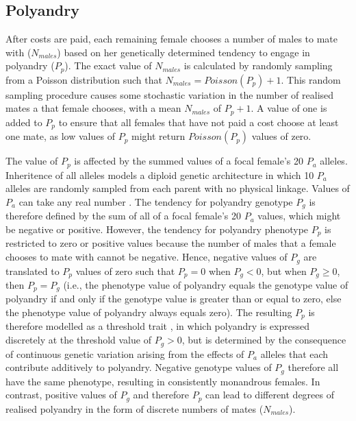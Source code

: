 \documentclass[10pt,letterpaper]{article}
\begin{document}
\subsection*{Polyandry}

After costs are paid, each remaining female chooses a number of males to mate with ($N_{males}$) based on her genetically determined tendency to engage in polyandry ($P_{p}$). The exact value of $N_{males}$ is calculated by randomly sampling from a Poisson distribution such that $N_{males} = Poisson(P_{p}) + 1$. This random sampling procedure causes some stochastic variation in the number of realised mates a that female chooses, with a mean $N_{males}$ of $P_{p}+1$. A value of one is added to $P_{p}$ to ensure that all females that have not paid a cost choose at least one mate, as low values of $P_{p}$ might return $Poisson(P_{p})$ values of zero.

The value of $P_{p}$ is affected by the summed values of a focal female's 20 $P_{a}$ alleles. Inheritence of all alleles models a diploid genetic architecture in which 10 $P_{a}$ alleles are randomly sampled from each parent with no physical linkage. Values of $P_{a}$ can take any real number \cite[continuum-of-alleles model;][]{Kimura1965, Lande1976, Reeve2000, Bocedi2014}. The tendency for polyandry genotype $P_{g}$ is therefore defined by the sum of all of a focal female's 20 $P_{a}$ values, which might be negative or positive. However, the tendency for polyandry phenotype $P_{p}$ is restricted to zero or positive values because the number of males that a female chooses to mate with cannot be negative. Hence, negative values of $P_{g}$ are translated to $P_{p}$ values of zero such that $P_{p} = 0$ when $P_{g} < 0$, but when $P_{g} \geq 0$, then $P_{p} = P_{g}$ (i.e., the phenotype value of polyandry equals the genotype value of polyandry if and only if the genotype value is greater than or equal to zero, else the phenotype value of polyandry always equals zero). The resulting $P_{p}$ is therefore modelled as a threshold trait \cite[][]{Lynch1998, Roff1996, Roff1998, Duthie}, in which polyandry is expressed discretely at the threshold value of $P_{g} > 0$, but is determined by the consequence of continuous genetic variation arising from the effects of $P_{a}$ alleles that each contribute additively to polyandry. Negative genotype values of $P_{g}$ therefore all have the same phenotype, resulting in consistently monandrous females. In contrast, positive values of $P_{g}$ and therefore $P_{p}$ can lead to different degrees of realised polyandry in the form of discrete numbers of mates ($N_{males}$).
\end{document}
